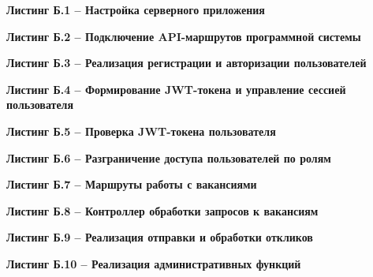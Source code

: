 
\textbf{Листинг Б.1 -- Настройка серверного приложения}


\textbf{Листинг Б.2 -- Подключение API-маршрутов программной системы}


\textbf{Листинг Б.3 -- Реализация регистрации и авторизации пользователей}


\textbf{Листинг Б.4 -- Формирование JWT-токена и управление сессией пользователя}


\textbf{Листинг Б.5 -- Проверка JWT-токена пользователя}


\textbf{Листинг Б.6 -- Разграничение доступа пользователей по ролям}


\textbf{Листинг Б.7 -- Маршруты работы с вакансиями}


\textbf{Листинг Б.8 -- Контроллер обработки запросов к вакансиям}


\textbf{Листинг Б.9 -- Реализация отправки и обработки откликов}


\textbf{Листинг Б.10 -- Реализация административных функций}


\fi